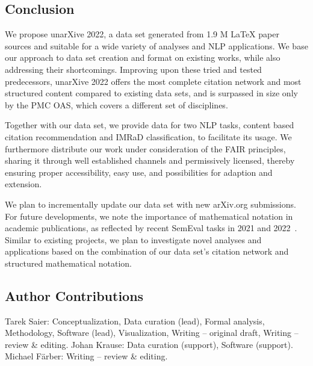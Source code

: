 \subsection{Conclusion}
We propose unarXive 2022, a data set generated from 1.9 M \LaTeX{} paper sources and suitable for a wide variety of analyses and NLP applications. We base our approach to data set creation and format on existing works, while also addressing their shortcomings. Improving upon these tried and tested predecessors, unarXive 2022 offers the most complete citation network and most structured content compared to existing data sets, and is surpassed in size only by the PMC OAS, which covers a different set of disciplines.

Together with our data set, we provide data for two NLP tasks, content based citation recommendation and IMRaD classification, to facilitate its usage. We furthermore distribute our work under consideration of the FAIR principles, sharing it through well established channels and permissively licensed, thereby ensuring proper accessibility, easy use, and possibilities for adaption and extension.

We plan to incrementally update our data set with new arXiv.org submissions. For future developments, we note the importance of mathematical notation in academic publications, as reflected by recent SemEval tasks in 2021 and 2022~\cite{semeval21_task8,semeval22_task12}. Similar to existing projects, we plan to investigate novel analyses and applications based on the combination of our data set's citation network and structured mathematical notation.





\subsection*{Author Contributions}  %
Tarek Saier: Conceptualization, Data curation (lead), Formal analysis, Methodology, Software (lead), Visualization, Writing -- original draft, Writing -- review \& editing. Johan Krause: Data curation (support), Software (support). Michael F{\"a}rber: Writing -- review \& editing.

